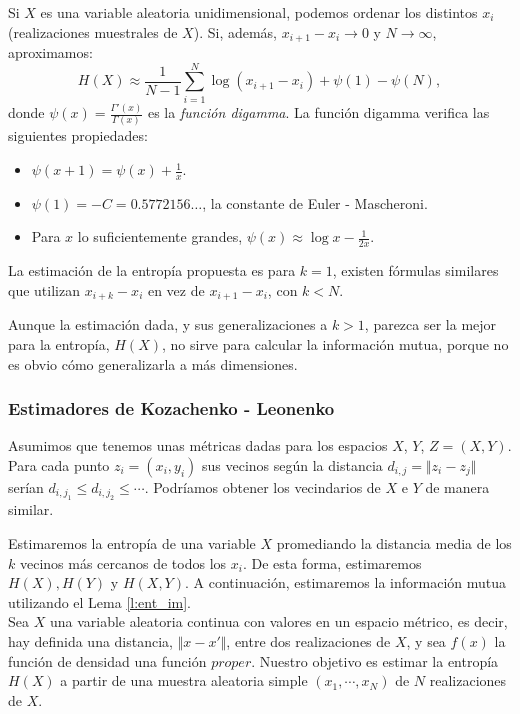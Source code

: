 \documentclass[10pt,a4paper]{article} %
\theoremstyle{definition}
\begin{document}
Si $X$ es una variable aleatoria unidimensional, podemos ordenar los distintos $x_i$ (realizaciones muestrales de $X$). Si, además, $x_{i+1} -x_i \to 0$ y $N\to \infty$, aproximamos:\[
H(X)\approx \frac{1}{N-1}\sum_{i=1}^N \log(x_{i+1}-x_i) + \psi(1) - \psi(N),\]
donde $\psi(x) = \frac{\Gamma'(x)}{\Gamma(x)}$ es la \textit{función digamma}. La función digamma verifica las siguientes propiedades:
\begin{itemize}
\item $\psi(x+1) = \psi(x) + \frac{1}{x}$.
\item $\psi(1) = -C = 0.5772156\dots$, la constante de Euler - Mascheroni.
  \item Para $x$ lo suficientemente grandes, $\psi(x) \approx \log x - \frac{1}{2x}$.
\end{itemize}

La estimación de la entropía propuesta es para $k=1$, existen fórmulas similares que utilizan $x_{i+k}-x_i$  en vez de $x_{i+1}-x_i$, con $k < N$.

Aunque la estimación dada, y sus generalizaciones a $k>1$, parezca ser la mejor para la entropía, $H(X)$, no sirve para calcular la información mutua, porque no es obvio cómo generalizarla a más dimensiones.

\subsubsection{Estimadores de Kozachenko - Leonenko}

Asumimos que tenemos unas métricas dadas para los espacios $X$, $Y$, $Z = (X,Y)$. Para cada punto $z_i = (x_i, y_i)$ sus vecinos según la distancia $d_{i,j}=\Vert z_i-z_j \Vert$ serían $d_{i,j_1} \leq d_{i,j_2} \leq \cdots$. Podríamos obtener los vecindarios de $X$ e $Y$ de manera similar.

Estimaremos la entropía de una variable $X$ promediando la distancia media de los $k$ vecinos más cercanos de todos los $x_i$. De esta forma, estimaremos $H(X), H(Y)$ y $H(X,Y)$. A continuación, estimaremos la información mutua utilizando el Lema \ref{l:ent_im}.\\

Sea $X$ una variable aleatoria continua con valores en un espacio métrico, es decir, hay definida una distancia, $\Vert x - x'\Vert$, entre dos realizaciones de $X$, y sea $f(x)$ la función de densidad una función $proper$. Nuestro objetivo es estimar la entropía $H(X)$ a partir de una muestra aleatoria simple $(x_1,\cdots,x_N)$ de $N$ realizaciones de $X$.
\end{document}
